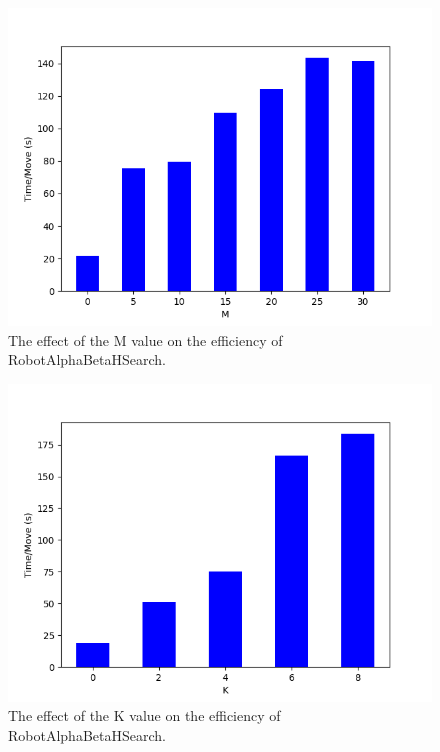 \begin{figure}
    \centering
    \includegraphics[scale = 0.6]{images/HSEARCHM_TIME_INF.png}
    \caption{The effect of the M value on the efficiency of RobotAlphaBetaHSearch.}
    \label{fig:hsearch_m_time}
\end{figure}

\begin{figure}
    \centering
    \includegraphics[scale = 0.6]{images/HSEARCHK_TIME_INF.png}
    \caption{The effect of the K value on the efficiency of RobotAlphaBetaHSearch.}
    \label{fig:hsearch_k_time}
\end{figure}






